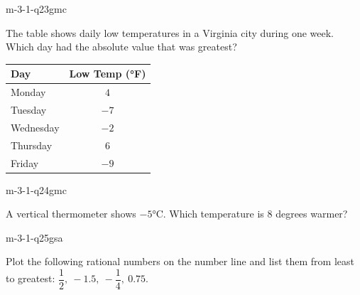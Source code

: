 \begin{practiceQuestion}{m-3-1-q23}{gmc}
\begin{questionText}
The table shows daily low temperatures in a Virginia city during one week. Which day had the absolute value that was greatest?

\begin{center}
\begin{tabular}{|l|c|}
\hline
\textbf{Day} & \textbf{Low Temp (°F)} \\
\hline
Monday & $4$ \\ \hline
Tuesday & $-7$ \\ \hline
Wednesday & $-2$ \\ \hline
Thursday & $6$ \\ \hline
Friday & $-9$ \\ \hline
\end{tabular}
\end{center}
\end{questionText}
\end{practiceQuestion}

\begin{practiceQuestion}{m-3-1-q24}{gmc}
\begin{questionText}
A vertical thermometer shows $-5°$C. Which temperature is $8$ degrees warmer?

\begin{center}
\end{center}
\end{questionText}
\end{practiceQuestion}

\begin{practiceQuestion}{m-3-1-q25}{gsa}
\begin{questionText}
Plot the following rational numbers on the number line and list them from least to greatest: $\dfrac{1}{2},\ -1.5,\ -\dfrac{1}{4},\ 0.75$.

\begin{center}
\end{center}
\end{questionText}
\end{practiceQuestion}

